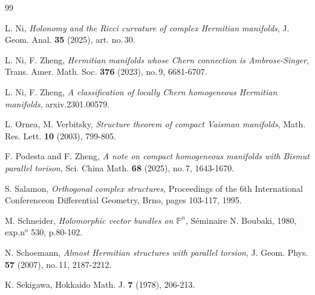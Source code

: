 \documentclass{amsart}
\numberwithin{equation}{section}
\theoremstyle{definition}
\renewcommand{\1}{\mathds{1}}
\renewcommand{\>}{\rightarrow}
\begin{document}
\begin{thebibliography}{99}

 L. Ni,
\newblock \textit{Holonomy and the Ricci curvature of complex Hermitian manifolds},
\newblock J. Geom. Anal. \textbf{35} (2025), art. no.\,30.

 L. Ni, F. Zheng,
\newblock \textit{Hermitian manifolds whose Chern connection is Ambrose-Singer},
\newblock Trans. Amer. Math. Soc. \textbf{376} (2023), no.\,9, 6681-6707.

 L. Ni, F. Zheng,
\newblock \textit{A classification of locally Chern homogeneous Hermitian manifolds},
\newblock arxiv.2301.00579.

 L. Ornea, M. Verbitsky,
\newblock \textit{Structure theorem of compact Vaisman manifolds},
\newblock Math. Res. Lett. \textbf{10} (2003), 799-805.


 F. Podesta and F. Zheng, \emph{ A note on compact homogeneous manifolds with Bismut parallel torison},   Sci. China Math. {\bf 68} (2025), no.\,7, 1643-1670.





 S. Salamon,
\newblock \textit{Orthogonal complex structures,}
\newblock Proceedings of the 6th International Conferenceon Differential Geometry, Brno, pages 103-117, 1995.



 M. Schneider,
\newblock \textit{Holomorphic vector bundles on ${\mathbb P}^n$},
\newblock S\'eminaire N. Boubaki, 1980, exp.n$^o$ 530, p.80-102.

 N. Schoemann,
\newblock \textit{Almost Hermitian structures with parallel torsion},
\newblock J. Geom. Phys. {\bf 57} (2007), no.\,11, 2187-2212.

 K. Sekigawa,
\newblock Hokkaido Math. J. {\bf 7} (1978), 206-213.


\end{thebibliography}
\end{document}
